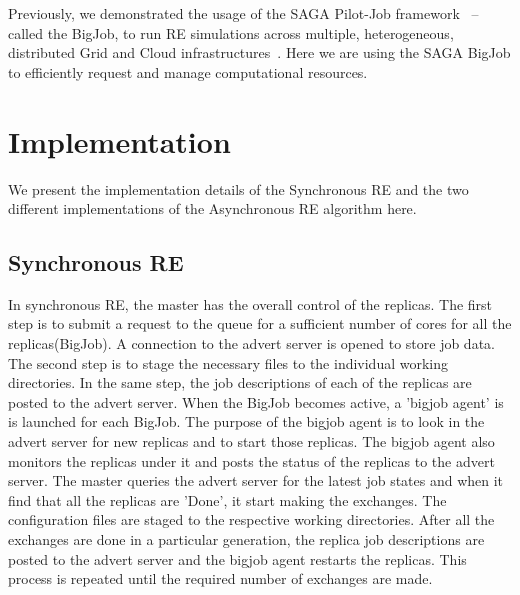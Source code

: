 \documentclass[a4paper,10pt]{article}
\begin{document}
Previously, we demonstrated the usage of the SAGA Pilot-Job framework~\cite{saga_bigjob_condor_cloud} -- called the BigJob, to run RE simulations across multiple, heterogeneous, distributed Grid and Cloud infrastructures~\cite{Luckow:2008fp}. Here we are using the SAGA BigJob to efficiently request and manage computational resources. 

\section{Implementation}
We present the implementation details of the Synchronous RE and the two different implementations of the Asynchronous RE algorithm here.

\subsection{Synchronous RE}

In synchronous RE, the master has the overall control of the replicas. The first step is to submit a request to the queue for a sufficient number of cores for all the replicas(BigJob). A connection to the advert server is opened to store job data. The second step is to stage the necessary files to the individual working directories. In the same step, the job descriptions of each of the replicas are posted to the advert server. When the BigJob becomes active, a 'bigjob agent' is is launched for each BigJob. The purpose of the bigjob agent is to look in the advert server for new replicas and to start those replicas. The bigjob agent also monitors the replicas under it and posts the status of the replicas to the advert server. The master queries the advert server for the latest job states and when it find that all the replicas are 'Done', it start making the exchanges. The configuration files are staged to the respective working directories. After all the exchanges are done in a particular generation, the replica job descriptions are posted to the advert server and the bigjob agent restarts the replicas. This process is repeated until the required number of exchanges are made. 
\end{document}
